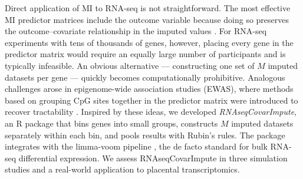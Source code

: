 \documentclass[11pt]{article}
\begin{document}
Direct application of MI to RNA-seq is not straightforward. The most effective MI predictor matrices include the outcome variable because doing so preserves the outcome--covariate relationship in the imputed values \citep{vanbuuren2011mice}. For RNA-seq experiments with tens of thousands of genes, however, placing every gene in the predictor matrix would require an equally large number of participants and is typically infeasible. An obvious alternative --- constructing one set of $M$ imputed datasets per gene --- quickly becomes computationally prohibitive. Analogous challenges arose in epigenome-wide association studies (EWAS), where methods based on grouping CpG sites together in the predictor matrix were introduced to recover tractability \citep{mill2013epigenomewide,weinhold2020statistical}. Inspired by these ideas, we developed \emph{RNAseqCovarImpute}, an R package that bins genes into small groups, constructs $M$ imputed datasets separately within each bin, and pools results with Rubin's rules. The package integrates with the limma-voom pipeline \citep{law2014voom,ritchie2015limma}, the de facto standard for bulk RNA-seq differential expression. We assess RNAseqCovarImpute in three simulation studies and a real-world application to placental transcriptomics.
\end{document}
